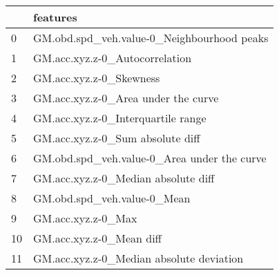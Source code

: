 \begin{tabular}{ll}
\toprule
{} &                                     features \\
\midrule
0  &   GM.obd.spd\_veh.value-0\_Neighbourhood peaks \\
1  &               GM.acc.xyz.z-0\_Autocorrelation \\
2  &                      GM.acc.xyz.z-0\_Skewness \\
3  &          GM.acc.xyz.z-0\_Area under the curve \\
4  &           GM.acc.xyz.z-0\_Interquartile range \\
5  &             GM.acc.xyz.z-0\_Sum absolute diff \\
6  &  GM.obd.spd\_veh.value-0\_Area under the curve \\
7  &          GM.acc.xyz.z-0\_Median absolute diff \\
8  &                  GM.obd.spd\_veh.value-0\_Mean \\
9  &                           GM.acc.xyz.z-0\_Max \\
10 &                     GM.acc.xyz.z-0\_Mean diff \\
11 &     GM.acc.xyz.z-0\_Median absolute deviation \\
\bottomrule
\end{tabular}

